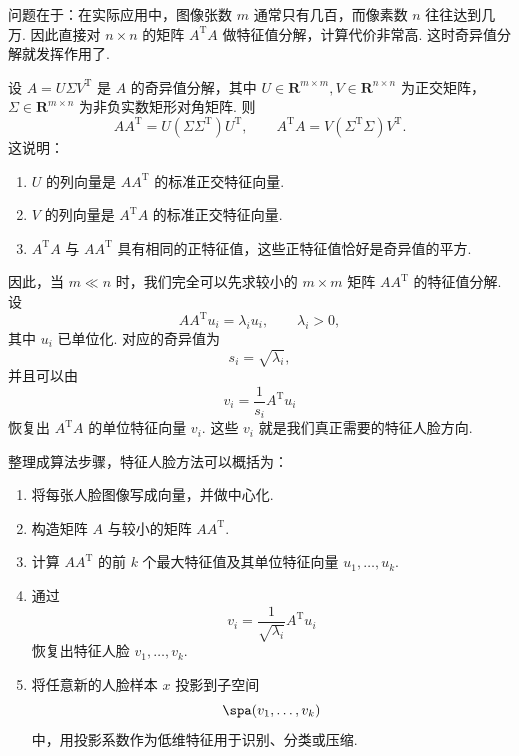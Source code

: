 问题在于：在实际应用中，图像张数 $m$ 通常只有几百，而像素数 $n$ 往往达到几万. 因此直接对 $n \times n$ 的矩阵 $A^{\mathrm{T}}A$ 做特征值分解，计算代价非常高. 这时奇异值分解就发挥作用了.

设 $A = U\Sigma V^{\mathrm{T}}$ 是 $A$ 的奇异值分解，其中 $U \in \mathbf{R}^{m \times m}, V \in \mathbf{R}^{n \times n}$ 为正交矩阵，$\Sigma \in \mathbf{R}^{m \times n}$ 为非负实数矩形对角矩阵. 则
\[
    AA^{\mathrm{T}} = U(\Sigma \Sigma^{\mathrm{T}})U^{\mathrm{T}},\qquad
    A^{\mathrm{T}}A = V(\Sigma^{\mathrm{T}}\Sigma)V^{\mathrm{T}}.
\]
这说明：
\begin{enumerate}
    \item $U$ 的列向量是 $AA^{\mathrm{T}}$ 的标准正交特征向量.

    \item $V$ 的列向量是 $A^{\mathrm{T}}A$ 的标准正交特征向量.

    \item $A^{\mathrm{T}}A$ 与 $AA^{\mathrm{T}}$ 具有相同的正特征值，这些正特征值恰好是奇异值的平方.
\end{enumerate}

因此，当 $m \ll n$ 时，我们完全可以先求较小的 $m \times m$ 矩阵 $AA^{\mathrm{T}}$ 的特征值分解. 设
\[
    AA^{\mathrm{T}}u_i = \lambda_i u_i,\qquad \lambda_i > 0,
\]
其中 $u_i$ 已单位化. 对应的奇异值为
\[
    s_i = \sqrt{\lambda_i},
\]
并且可以由
\[
    v_i = \frac{1}{s_i}A^{\mathrm{T}}u_i
\]
恢复出 $A^{\mathrm{T}}A$ 的单位特征向量 $v_i$. 这些 $v_i$ 就是我们真正需要的特征人脸方向.

整理成算法步骤，特征人脸方法可以概括为：
\begin{enumerate}
    \item 将每张人脸图像写成向量，并做中心化.

    \item 构造矩阵 $A$ 与较小的矩阵 $AA^{\mathrm{T}}$.

    \item 计算 $AA^{\mathrm{T}}$ 的前 $k$ 个最大特征值及其单位特征向量 $u_1, \ldots, u_k$.

    \item 通过
          \[
              v_i = \frac{1}{\sqrt{\lambda_i}}A^{\mathrm{T}}u_i
          \]
          恢复出特征人脸 $v_1, \ldots, v_k$.

    \item 将任意新的人脸样本 $x$ 投影到子空间
          \[
              \spa(v_1, \ldots, v_k)
          \]
          中，用投影系数作为低维特征用于识别、分类或压缩.
\end{enumerate}

